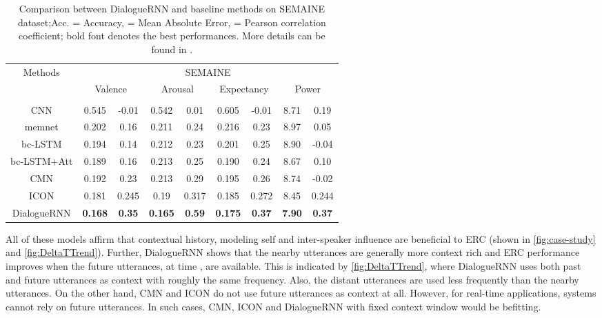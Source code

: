 \documentclass{IEEEtran}\usepackage[pdftex]{graphicx}
\begin{document}
	\begin{table*}[t]
		\centering
\begin{tabular}{c||c@{~~}c|c@{~~}c|c@{~~}c|c@{~~}c}
			\hline
			\multirow{3}{*}{Methods} & \multicolumn{8}{c}{SEMAINE}\\
			\cline{2-9} &\multicolumn{2}{c|}{Valence}& \multicolumn{2}{c|}{Arousal}& \multicolumn{2}{c|}{Expectancy} & \multicolumn{2}{c}{Power}\\
			\cline{2-9} &  &  &  &  &  &  &  & \\
			\hline
			\hline
			CNN &0.545&-0.01&0.542&0.01&0.605&-0.01&8.71&0.19 \\
			memnet &0.202&0.16&0.211&0.24&0.216&0.23&8.97&0.05\\
			bc-LSTM &0.194&0.14&0.212&0.23&0.201&0.25&8.90&-0.04 \\
			bc-LSTM+Att &0.189&0.16&0.213&0.25&0.190&0.24&8.67&0.10 \\
			\hline
			CMN &0.192&0.23&0.213&0.29&0.195&0.26&8.74&-0.02 \\
			ICON&0.181&0.245&0.19&0.317&0.185&0.272&8.45&0.244\\
			\hline
			DialogueRNN &{\bf 0.168}&{\bf 0.35}&{\bf 0.165}&{\bf 0.59}&{\bf 0.175}&{\bf 0.37}&{\bf 7.90}&{\bf 0.37}\\
			\hline
		\end{tabular}
		\caption{Comparison between DialogueRNN and baseline methods on SEMAINE dataset;Acc. = Accuracy,
			 = Mean Absolute Error,  = Pearson correlation coefficient; bold font denotes
			the best performances. More details can be found in \citet{majumder2019dialoguernn}.}
		\label{tab:results-text2}
	\end{table*}
	
	All of these models affirm that contextual history, modeling self and inter-speaker influence are beneficial to ERC (shown in \cref{fig:case-study} and \cref{fig:DeltaTTrend}). Further, DialogueRNN shows that the nearby utterances are generally more context rich and ERC performance improves when the future utterances, at time , are available. This is indicated by \cref{fig:DeltaTTrend}, where DialogueRNN uses both past and future utterances as context with roughly the same frequency. Also, the distant utterances are used less frequently than the nearby utterances. On the other hand, CMN and ICON do not use future utterances as context at all. However, for real-time applications, systems cannot rely on future utterances. In such cases, CMN, ICON and DialogueRNN with fixed context window would be befitting.
	
\end{document}
